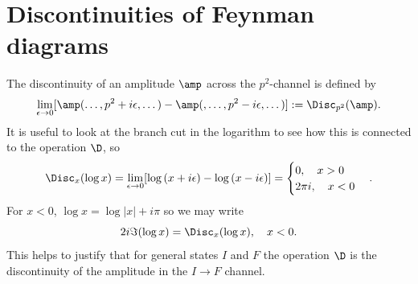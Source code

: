 \section{Discontinuities of Feynman diagrams}
The discontinuity of an amplitude $\amp$ across the $p^2$-channel is defined by 
\begin{equation}
    \lim_{\epsilon \to 0}[\amp(\dots,p^2 + i\epsilon,\dots) - \amp(,\dots,p^2 - i\epsilon,\dots)] := \Disc_{p^2}(\amp).
\end{equation}
It is useful to look at the branch cut in the logarithm to see how this is connected to the operation $\D$, so
\begin{equation}
    \Disc_{x}(\log{x}) = \lim_{\epsilon \to 0}[\log{(x + i\epsilon)} - \log{(x - i\epsilon)}] = 
    \begin{cases}
        0,\quad x > 0 \\
        2\pi i,\quad x < 0
    \end{cases}.
\end{equation}
For $x < 0$, $\log{x} = \log{|x|} + i\pi$ so we may write 
\begin{equation}
    2i\Im{(\log{x})} = \Disc_{x}(\log{x}),\quad x < 0.
\end{equation}
This helps to justify that for general states $I$ and $F$ the operation $\D$ is the discontinuity of the amplitude in the $I \to F$ channel. 

